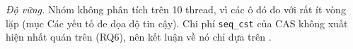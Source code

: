 \emph{Độ vững.} Nhóm không phân tích  trên 10 thread, vì các ô đó đo với rất ít vòng lặp
(mục Các yếu tố đe dọa độ tin cậy). Chi phí
\texttt{seq\_cst} của CAS không xuất hiện nhất quán trên  (RQ6), nên kết luận về nó
chỉ dựa trên .
